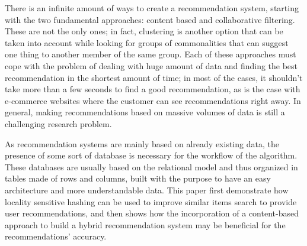 There is an infinite amount of ways to create a recommendation system, starting with the two fundamental approaches: content based and collaborative filtering. These are not the only ones; in fact, clustering is another option that can be taken into account while looking for groups of commonalities that can suggest one thing to another member of the same group. Each of these approaches must cope with the problem of dealing with huge amount of data and finding the best recommendation in the shortest amount of time; in most of the cases, it shouldn't take more than a few seconds to find a good recommendation, as is the case with e-commerce websites where the customer can see recommendations right away. In general, making recommendations based on massive volumes of data is still a challenging research problem. 

As recommendation systems are mainly based on already existing data, the presence of some sort of database is necessary for the workflow of the algorithm.
These databases are usually based on the relational model and thus organized in tables made of rows and columns, built with the purpose to have an easy architecture and more understandable data. This paper first demonstrate how locality sensitive hashing can be used to improve similar items search to provide user recommendations, and then shows how the incorporation of a content-based approach to build a hybrid recommendation system may be beneficial for the recommendations' accuracy. 
